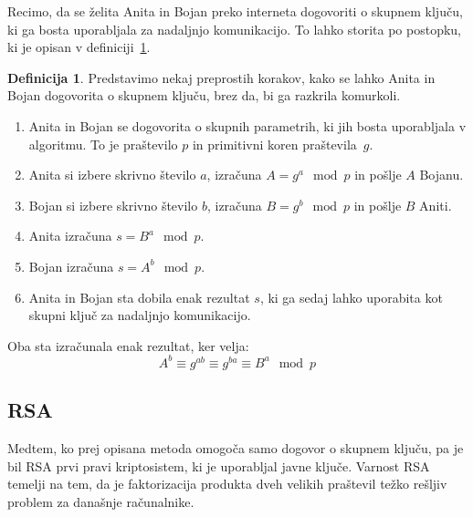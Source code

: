 \documentclass[12pt,a4paper,openany,tikz]{book}
\theoremstyle{plain}
\theoremstyle{definition}
\newtheorem{defn}[thm]{Definicija} %
\begin{document}
Recimo, da se želita Anita in Bojan preko interneta dogovoriti o skupnem ključu, ki ga bosta uporabljala za nadaljnjo komunikacijo. To lahko storita po postopku, ki je opisan v definiciji~\ref{def:dhprob}.

\begin{mdframed}[frametitle={Dogovor o ključu Diffe-Hellman}]
\begin{minipage}{\textwidth}
\begin{defn} Predstavimo nekaj preprostih korakov, kako se lahko Anita in Bojan dogovorita o skupnem ključu, brez da, bi ga razkrila komurkoli.
\begin{enumerate}
	\item Anita in Bojan se dogovorita o skupnih parametrih, ki jih bosta uporabljala v algoritmu. To je praštevilo $p$ in primitivni koren praštevila~$g$.
	\item Anita si izbere skrivno število $a$, izračuna $A=g^a \mod p$ in pošlje $A$ Bojanu.
	\item Bojan si izbere skrivno število $b$, izračuna $B=g^b \mod p$ in pošlje $B$ Aniti.
	\item Anita izračuna $s=B^a \mod p$.
	\item Bojan izračuna $s=A^b \mod p$.
	\item Anita in Bojan sta dobila enak rezultat $s$, ki ga sedaj lahko uporabita kot skupni ključ za nadaljnjo komunikacijo.
\end{enumerate}
Oba sta izračunala enak rezultat, ker velja:
$$
A^b \equiv g^{ab} \equiv g^{ba} \equiv B^a \mod p
$$
\label{def:dhprob}
\end{defn}
\end{minipage}
\end{mdframed}


\subsection{RSA}
\label{sub:RSA}

Medtem, ko prej opisana metoda omogoča samo dogovor o skupnem ključu, pa je bil \gls{RSA} prvi pravi kriptosistem, ki je uporabljal javne ključe. Varnost \gls{RSA} temelji na tem, da je faktorizacija produkta dveh velikih praštevil težko rešljiv problem za današnje računalnike.
\end{document}
